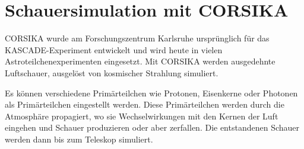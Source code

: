 \section{Schauersimulation mit CORSIKA}

CORSIKA wurde am Forschungszentrum Karlsruhe ursprünglich für das KASCADE-Experiment entwickelt und wird heute in vielen Astroteilchenexperimenten eingesetzt.
Mit CORSIKA werden ausgedehnte Luftschauer, ausgelöst von kosmischer Strahlung simuliert.

Es können verschiedene Primärteilchen wie Protonen, Eisenkerne oder Photonen als Primärteilchen eingestellt werden.
Diese Primärteilchen werden durch die Atmosphäre propagiert, wo sie Wechselwirkungen mit den Kernen der Luft eingehen und Schauer produzieren oder aber zerfallen.
Die entstandenen Schauer werden dann bis zum Teleskop simuliert.



